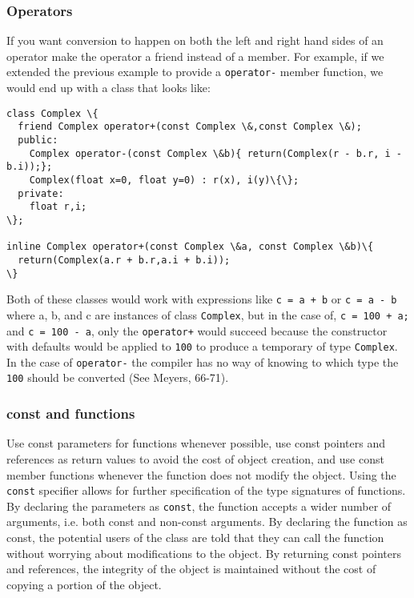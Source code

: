 \subsubsection{Operators}
If you want conversion to happen on both the left and right hand sides of
an operator make the operator a friend instead of a member. For example,
if we extended the previous example to provide a \texttt{operator-} member
function, we would end up with a class that looks like:
\begin{verbatim}
class Complex \{
  friend Complex operator+(const Complex \&,const Complex \&);
  public:
    Complex operator-(const Complex \&b){ return(Complex(r - b.r, i - b.i));};
    Complex(float x=0, float y=0) : r(x), i(y)\{\};
  private:
    float r,i;
\};

inline Complex operator+(const Complex \&a, const Complex \&b)\{
  return(Complex(a.r + b.r,a.i + b.i));
\}
\end{verbatim}
\noindent
Both of these classes would work with expressions like \texttt{c = a + b} or
\texttt{c = a - b} where a, b, and c are instances of class \texttt{Complex}, but
in the case of, \texttt{c = 100 + a;} and \texttt{c = 100 - a}, only the 
\texttt{operator+} would succeed because the constructor with defaults
would be applied to \texttt{100} to produce a temporary of type \texttt{Complex}.
In the case of \texttt{operator-} the compiler has no way of knowing to which
type the \texttt{100} should be converted (See Meyers, 66-71).

\subsubsection{const and functions}
Use const parameters for functions whenever possible, use const pointers and
references as return values to avoid the cost of object creation, and
use const member functions whenever the function does not modify the
object. Using the \texttt{const} specifier allows for further specification
of the type signatures of functions. By declaring the parameters as 
\texttt{const}, the function accepts a wider number of arguments, i.e. both
const and non-const arguments. By declaring the function as const, the
potential users of the class are told that they can call the function without
worrying about modifications to the object. By returning const pointers and
references, the integrity of the object is maintained without the cost
of copying a portion of the object.  

